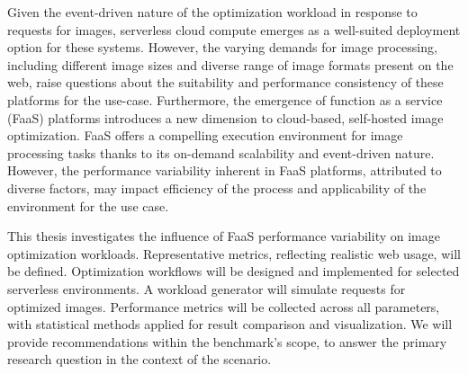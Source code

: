 Given the event-driven nature of the optimization workload in response to requests for images, serverless cloud compute emerges as a well-suited deployment option for these systems.
However, the varying demands for image processing, including different image sizes and diverse range of image formats present on the web, raise questions about the suitability and performance consistency of these platforms for the use-case.
Furthermore, the emergence of function as a service (FaaS) platforms introduces a new dimension to cloud-based, self-hosted image optimization.
FaaS offers a compelling execution environment for image processing tasks thanks to its on-demand scalability and event-driven nature.
However, the performance variability inherent in FaaS platforms, attributed to diverse factors, may impact efficiency of the process and applicability of the environment for the use case.


This thesis investigates the influence of FaaS performance variability on image optimization workloads. Representative metrics, reflecting realistic web usage, will be defined. Optimization workflows will be designed and implemented for selected serverless environments. A workload generator will simulate requests for optimized images. Performance metrics will be collected across all parameters, with statistical methods applied for result comparison and visualization. We will provide recommendations within the benchmark's scope, to answer the primary research question in the context of the scenario.


